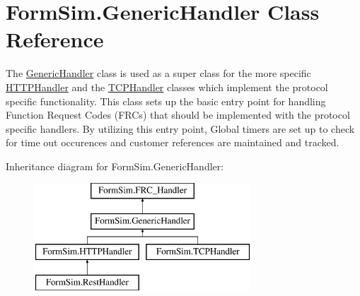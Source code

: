 \hypertarget{class_form_sim_1_1_generic_handler}{}\section{Form\+Sim.\+Generic\+Handler Class Reference}
\label{class_form_sim_1_1_generic_handler}


The \mbox{\hyperlink{class_form_sim_1_1_generic_handler}{Generic\+Handler}} class is used as a super class for the more specific \mbox{\hyperlink{class_form_sim_1_1_h_t_t_p_handler}{H\+T\+T\+P\+Handler}} and the \mbox{\hyperlink{class_form_sim_1_1_t_c_p_handler}{T\+C\+P\+Handler}} classes which implement the protocol specific functionality. This class sets up the basic entry point for handling Function Request Codes (F\+R\+Cs) that should be implemented with the protocol specific handlers. By utilizing this entry point, Global timers are set up to check for time out occurences and customer references are maintained and tracked.  


Inheritance diagram for Form\+Sim.\+Generic\+Handler\+:\begin{figure}[H]
\begin{center}
\leavevmode
\includegraphics[height=4.000000cm]{class_form_sim_1_1_generic_handler}
\end{center}
\end{figure}
